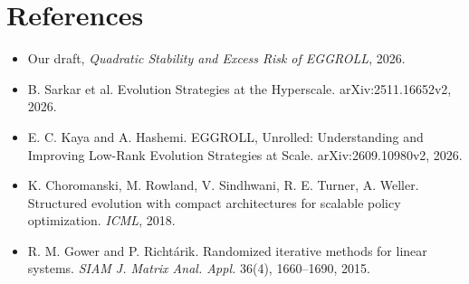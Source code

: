 \documentclass[11pt]{article}
\theoremstyle{remark}
\begin{document}
\section*{References}
{\small
\begin{itemize}[leftmargin=2.2em]
\item[{[D]}] Our draft, \emph{Quadratic Stability and Excess Risk of EGGROLL}, 2026.
\item[{[1]}] B. Sarkar et al. Evolution Strategies at the Hyperscale. arXiv:2511.16652v2, 2026.
\item[{[2]}] E. C. Kaya and A. Hashemi. EGGROLL, Unrolled: Understanding and Improving Low-Rank Evolution Strategies at Scale. arXiv:2609.10980v2, 2026.
\item[{[3]}] K. Choromanski, M. Rowland, V. Sindhwani, R. E. Turner, A. Weller. Structured evolution with compact architectures for scalable policy optimization. \emph{ICML}, 2018.
\item[{[4]}] R. M. Gower and P. Richt\'arik. Randomized iterative methods for linear systems. \emph{SIAM J. Matrix Anal. Appl.} 36(4), 1660--1690, 2015.
\end{itemize}}
\end{document}

